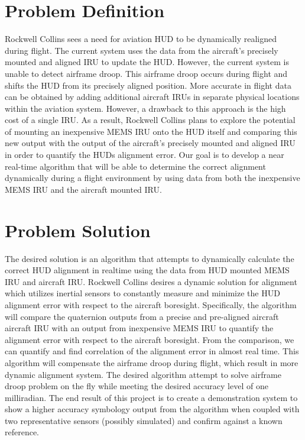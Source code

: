 \documentclass[letterpaper,10pt,titlepage]{article}
\begin{document}
\section*{Problem Definition}
Rockwell Collins sees a need for aviation HUD to be dynamically realigned during flight. The current system uses the data from the aircraft’s precisely mounted and aligned IRU to update the HUD. However, the current system is unable to detect airframe droop. This airframe droop occurs during flight and shifts the HUD from its precisely aligned position. More accurate in flight data can be obtained by adding additional aircraft IRUs in separate physical locations within the aviation system. However, a drawback to this approach is the high cost of a single IRU. As a result, Rockwell Collins plans to explore the potential of mounting an inexpensive MEMS IRU onto the HUD itself and comparing this new output with the output of the aircraft’s precisely mounted and aligned IRU in order to quantify the HUDs alignment error. Our goal is to develop a near real-time algorithm that will be able to determine the correct alignment dynamically during a flight environment by using data from both the inexpensive MEMS IRU and the aircraft mounted IRU.

\section*{Problem Solution}
The desired solution is an algorithm that attempts to dynamically calculate the correct HUD alignment in realtime using the data from HUD mounted MEMS IRU and aircraft IRU. Rockwell Collins desires a dynamic solution for alignment which utilizes inertial sensors to constantly measure and minimize the HUD alignment error with respect to the aircraft boresight. Specifically, the algorithm will compare the quaternion outputs from a precise and pre-aligned aircraft aircraft IRU with an output from inexpensive MEMS IRU to quantify the alignment error with respect to the aircraft boresight. From the comparison, we can quantify and find correlation of the alignment error in almost real time. This algorithm will compensate the airframe droop during flight, which result in more dynamic alignment system. The desired algorithm attempt to solve airframe droop problem on the fly while meeting the desired accuracy level of one milliradian. The end result of this project is to create a demonstration system to show a higher accuracy symbology output from the algorithm when coupled with two representative sensors (possibly simulated) and confirm against a known reference.
\end{document}
